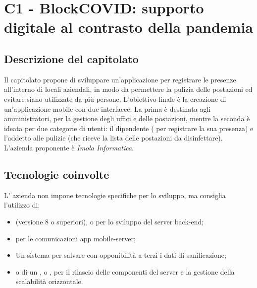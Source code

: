 \section{C1 - BlockCOVID: supporto digitale al contrasto della pandemia}
\subsection{Descrizione del capitolato}
Il capitolato propone di sviluppare un'applicazione per registrare le presenze all'interno di locali aziendali, in modo da permettere la pulizia delle postazioni ed evitare siano utilizzate da più persone.
L'obiettivo finale è la creazione di un'applicazione mobile con due interfacce. La prima è destinata agli amministratori, per la gestione degli uffici e delle postazioni, mentre la seconda è ideata per due categorie di utenti: il dipendente ( per registrare la sua presenza) e l'addetto alle pulizie (che riceve la lista delle postazioni da disinfettare).\\
L'azienda proponente è \textit{Imola Informatica}.

\subsection{Tecnologie coinvolte}
L' azienda non impone tecnologie specifiche per lo sviluppo, ma consiglia l'utilizzo di:
\begin{itemize}
\item {} (versione 8 o superiori),  o  per lo sviluppo del server back-end;
\item	{} per le comunicazioni app mobile-server;
\item	Un sistema  per salvare con opponibilità a terzi i dati di sanificazione;
\item	{} o di un ,  o , per il rilascio delle componenti del server e la gestione della scalabilità orizzontale.
\end{itemize}

